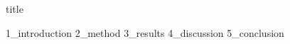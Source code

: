 \documentclass{article}
\begin{document}
{title}

\frontmatter

\begin{abstract}
    {0_abstract}
\end{abstract}
\clearpage


\tableofcontents

\listoffigures
\listoftables

\mainmatter


{1_introduction}
{2_method}
{3_results}
{4_discussion}
{5_conclusion}

\newpage



\addappendix

\end{document}
